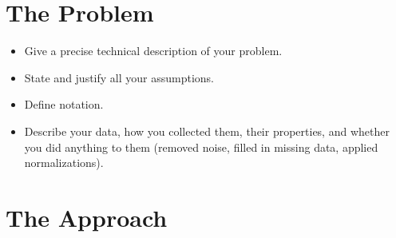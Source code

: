 \documentclass[10pt]{article}
\begin{document}
\section{The Problem}
\begin{itemize}
\item Give a precise technical description of your problem. 

\item State and justify all your assumptions. 

\item Define notation. 

\item Describe your data, how you collected them, their properties,
and whether you did 
anything to them (removed noise, filled in missing data, 
applied normalizations).
\end{itemize}

\section{The Approach}
\end{document}

